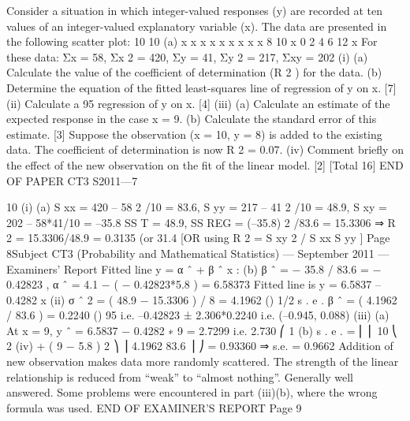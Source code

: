 Consider a situation in which integer-valued responses (y) are recorded at ten values
of an integer-valued explanatory variable (x). The data are presented in the following
scatter plot:
10
10
(a)
x
x
x
x
x
x
x
x x
8 10
x
0
2
4
6
12
x
For these data: Σx = 58, Σx 2 = 420, Σy = 41, Σy 2 = 217, Σxy = 202
(i)
(a) Calculate the value of the coefficient of determination (R 2 ) for the data.
(b) Determine the equation of the fitted least-squares line of regression of
y on x.
[7]
(ii) Calculate a 95%
regression of y on x.
[4]
(iii) (a)
Calculate an estimate of the expected response in the case x = 9.
(b)
Calculate the standard error of this estimate.
[3]
Suppose the observation (x = 10, y = 8) is added to the existing data. The coefficient
of determination is now R 2 = 0.07.
(iv)
Comment briefly on the effect of the new observation on the fit of the linear
model.
[2]
[Total 16]
END OF PAPER
CT3 S2011—7

10
(i)
(a)
S xx = 420 – 58 2 /10 = 83.6, S yy = 217 – 41 2 /10 = 48.9,
S xy = 202 – 58*41/10 = –35.8
SS T = 48.9, SS REG = (–35.8) 2 /83.6 = 15.3306
⇒ R 2 = 15.3306/48.9 = 0.3135 (or 31.4%
[OR using R 2 = S xy 2 / S xx S yy ]
Page 8Subject CT3 (Probability and Mathematical Statistics) — September 2011 — Examiners’ Report
Fitted line y = α ˆ + β ˆ x :
(b)
β ˆ = − 35.8 / 83.6 = − 0.42823 , α ˆ = 4.1 − ( − 0.42823*5.8 ) = 6.58373
Fitted line is y = 6.5837 – 0.4282 x
(ii)
σ ˆ 2 = ( 48.9 − 15.3306 ) / 8 = 4.1962
()
1/2
s . e . β ˆ = ( 4.1962 / 83.6 ) = 0.2240
()
95%
i.e. –0.42823 ± 2.306*0.2240
i.e. (–0.945, 0.088)
(iii)
(a) At x = 9, y ˆ = 6.5837 − 0.4282 ∗ 9 = 2.7299 i.e. 2.730
⎛ 1
(b) s . e . = ⎜
⎜ 10
⎝
2
(iv)
+
( 9 − 5.8 ) 2 ⎞ ⎟ 4.1962
83.6
⎟
⎠
= 0.93360 ⇒ s.e. = 0.9662
Addition of new observation makes data more randomly scattered. The
strength of the linear relationship is reduced from “weak” to “almost nothing”.
Generally well answered. Some problems were encountered in part (iii)(b), where the wrong
formula was used.
END OF EXAMINER’S REPORT
Page 9
